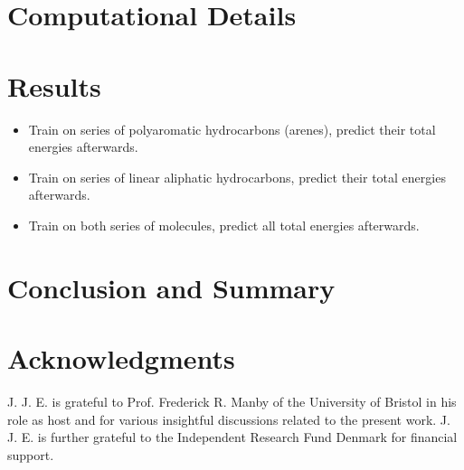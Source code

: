 \documentclass[journal=jctc,manuscript=article]{achemso}
\begin{document}
%
%

\section{Computational Details}\label{comp_details_sect}

{\color{red}{Write me...}}

%
%

\section{Results}\label{results_sect}

\begin{itemize}
\item Train on series of polyaromatic hydrocarbons (arenes), predict their total energies afterwards.
\item Train on series of linear aliphatic hydrocarbons, predict their total energies afterwards.
\item Train on both series of molecules, predict all total energies afterwards.
\end{itemize}

%
%

\section{Conclusion and Summary}\label{conclusion_sect}

%
%
\section*{Acknowledgments}
%

J. J. E. is grateful to Prof. Frederick R. Manby of the University of Bristol in his role as host and for various insightful discussions related to the present work. J. J. E. is further grateful to the Independent Research Fund Denmark for financial support.

\newpage


\end{document}
